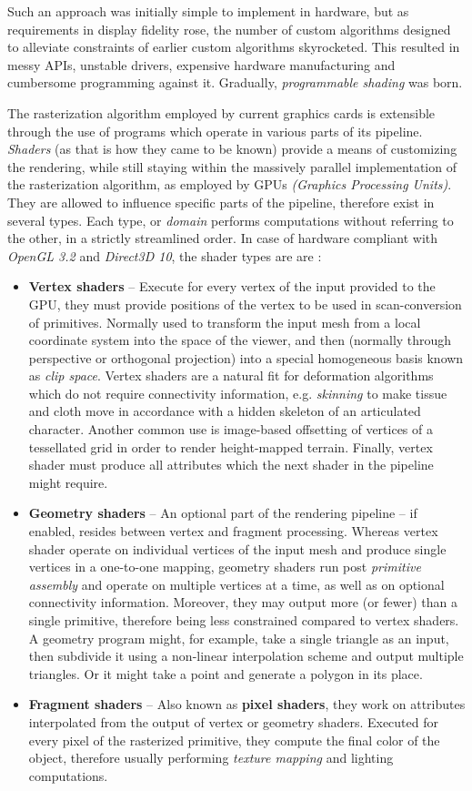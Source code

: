 Such an approach was initially simple to implement in hardware, but as requirements in display fidelity rose, the number of custom algorithms designed to alleviate constraints of earlier custom algorithms skyrocketed. This resulted in messy APIs, unstable drivers, expensive hardware manufacturing and cumbersome programming against it. Gradually, \emph{programmable shading} was born.

The rasterization algorithm employed by current graphics cards is extensible through the use of programs which operate in various parts of its pipeline. \emph{Shaders} (as that is how they came to be known) provide a means of customizing the rendering, while still staying within the massively parallel implementation of the rasterization algorithm, as employed by GPUs \emph{(Graphics Processing Units)}. They are allowed to influence specific parts of the pipeline, therefore exist in several types. Each type, or \emph{domain} performs computations without referring to the other, in a strictly streamlined order. In case of hardware compliant with \emph{OpenGL 3.2} and \emph{Direct3D 10}, the shader types are are \cite{glspec32, SM4}:
\begin{itemize}
\item \textbf{Vertex shaders} -- Execute for every vertex of the input provided to the GPU, they must provide positions of the vertex to be used in scan-conversion of primitives. Normally used to transform the input mesh from a local coordinate system into the space of the viewer, and then (normally through perspective or orthogonal projection) into a special homogeneous basis known as \emph{clip space}. Vertex shaders are a natural fit for deformation algorithms which do not require connectivity information, e.g. \emph{skinning} to make tissue and cloth move in accordance with a hidden skeleton of an articulated character. Another common use is image-based offsetting of vertices of a tessellated grid in order to render height-mapped terrain. Finally, vertex shader must produce all attributes which the next shader in the pipeline might require.
\item \textbf{Geometry shaders} -- An optional part of the rendering pipeline -- if enabled, resides between vertex and fragment processing. Whereas vertex shader operate on individual vertices of the input mesh and produce single vertices in a one-to-one mapping, geometry shaders run post \emph{primitive assembly} and operate on multiple vertices at a time, as well as on optional connectivity information. Moreover, they may output more (or fewer) than a single primitive, therefore being less constrained compared to vertex shaders. A geometry program might, for example, take a single triangle as an input, then subdivide it using a non-linear interpolation scheme and output multiple triangles. Or it might take a point and generate a polygon in its place.
\item \textbf{Fragment shaders} -- Also known as \textbf{pixel shaders}, they work on attributes interpolated from the output of vertex or geometry shaders. Executed for every pixel of the rasterized primitive, they compute the final color of the object, therefore usually performing \emph{texture mapping} and lighting computations.
\end{itemize}

